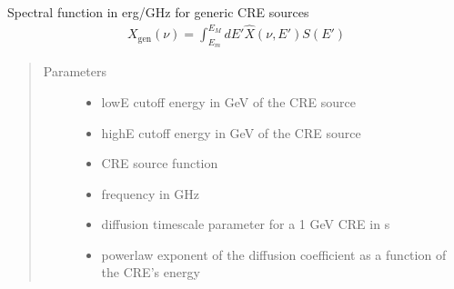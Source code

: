 \documentclass[letterpaper,10pt,english]{sphinxmanual}
\begin{document}

\begin{fulllineitems}
\label{\detokenize{diffsph.spectra:diffsph.spectra.synchrotron.X_gen}}
\sphinxAtStartPar
Spectral function in erg/GHz for generic CRE sources
\begin{equation*}
\begin{split}X_\text{gen}(\nu) = \int_{E_m}^{E_M}dE'\hat X(\nu, E')S(E')\end{split}
\end{equation*}\begin{quote}\begin{description}
\item[{Parameters}] \leavevmode\begin{itemize}
\item {} 
\sphinxAtStartPar
{} \textendash{} low\sphinxhyphen{}E cutoff energy in GeV of the CRE source 

\item {} 
\sphinxAtStartPar
{} \textendash{} high\sphinxhyphen{}E cutoff energy in GeV of the CRE source 

\item {} 
\sphinxAtStartPar
{} \textendash{} CRE source function

\item {} 
\sphinxAtStartPar
{} \textendash{} frequency in GHz

\item {} 
\sphinxAtStartPar
{} \textendash{} diffusion time\sphinxhyphen{}scale parameter for a 1 GeV CRE in s

\item {} 
\sphinxAtStartPar
{} \textendash{} power\sphinxhyphen{}law exponent of the diffusion coefficient as a function of the CRE’s energy


\end{itemize}
\end{description}
\end{quote}
\end{fulllineitems}
\end{document}
